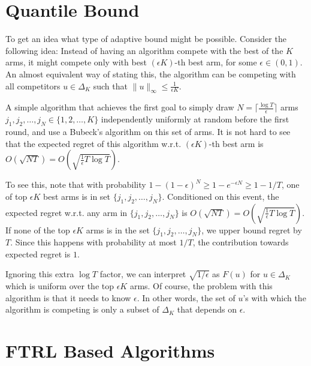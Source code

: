 \documentclass[12pt]{article}
\newcommand{\norm}[1]{\|#1\|}
\begin{document}
\section{Quantile Bound}

To get an idea what type of adaptive bound might be possible. Consider the
following idea: Instead of having an algorithm compete with the best of the $K$
arms, it might compete only with best $(\epsilon K)$-th best arm, for some
$\epsilon \in (0,1)$. An almost equivalent way of stating this, the algorithm
can be competing with all competitors $u \in \Delta_K$ such that
$\norm{u}_\infty \le \frac{1}{\epsilon K}$.

A simple algorithm that achieves the first goal to simply draw $N =
\lceil \frac{\log T}{\epsilon} \rceil$ arms $j_1, j_2, \dots, j_N \in \{1,2, \dots, K\}$
independently uniformly at random before the first round, and use a Bubeck's
algorithm on this set of arms. It is not hard to see that the expected regret
of this algorithm w.r.t. $(\epsilon K)$-th best arm is
$O(\sqrt{N T}) = O \left(\sqrt{\frac{1}{\epsilon} T \log T} \right)$.

To see this, note that with probability $1 - (1-\epsilon)^N \ge 1 -
e^{-\epsilon N} \ge 1 - 1/T$, one of top $\epsilon K$ best arms is in set
$\{j_1, j_2, \dots, j_N\}$. Conditioned on this event, the expected regret
w.r.t.  any arm in $\{j_1, j_2, \dots, j_N\}$ is $O(\sqrt{NT}) =
O\left(\sqrt{\frac{1}{\epsilon} T \log T}\right)$.  If none of the top $\epsilon K$
arms is in the set $\{j_1, j_2, \dots, j_N\}$, we upper bound regret by $T$.
Since this happens with probability at most $1/T$, the contribution towards
expected regret is $1$.

Ignoring this extra $\log T$ factor, we can interpret $\sqrt{1/\epsilon}$ as
$F(u)$ for $u \in \Delta_K$ which is uniform over the top $\epsilon K$ arms.
Of course, the problem with this algorithm is that it needs to know $\epsilon$.
In other words, the set of $u$'s with which the algorithm is competing is only
a subset of $\Delta_K$ that depends on $\epsilon$.

\section{FTRL Based Algorithms}
\end{document}
